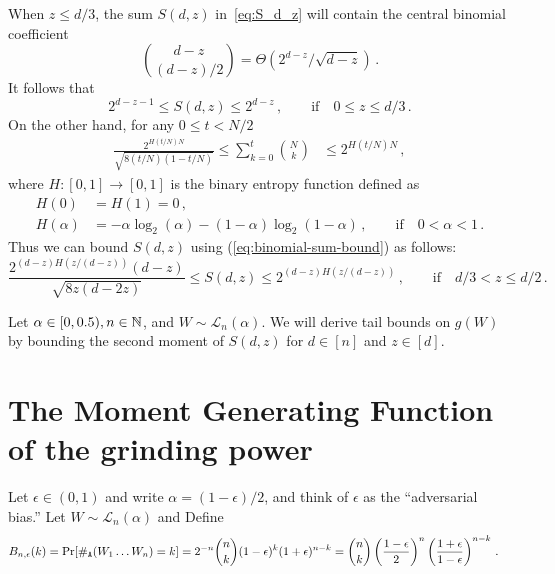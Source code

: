 When $z \leq d/3$, the sum $S(d,z)$ in~\eqref{eq:S_d_z} 
will contain the central binomial coefficient $${d-z \choose (d-z)/2} = \Theta(2^{d-z}/\sqrt{d-z})\,.$$ 
It follows that 
\begin{equation} \label{eq:S_d_z_small}
    2^{d-z-1} 
    \leq 
    S(d,z)
    \leq 2^{d-z}\,, 
    \qquad \text{if}\quad 0 \leq z \leq d/3 
    \,.
\end{equation}
On the other hand, for any $0 \leq t < N/2$
\begin{align}\label{eq:binomial-sum-bound}
\frac{2^{H(t/N)N} }{\sqrt{8 (t/N) (1-t/N)} }
\leq 
\sum_{k=0}^t{ {N \choose k} } 
&\leq 
2^{H(t/N)N} \, , 
\end{align}
where $H : [0, 1] \rightarrow [0, 1]$ is the binary entropy function defined as
\begin{align*}
    H(0) &= H(1) = 0\, , \\
    H(\alpha) &= -\alpha \log_2(\alpha) - (1-\alpha) \log_2(1-\alpha)\,, 
        \qquad \text{if}\quad 0 < \alpha < 1\, .
\end{align*}
Thus we can bound $S(d,z)$ using (\ref{eq:binomial-sum-bound}) as follows:
\begin{equation} \label{eq:S_d_z_large}
    \frac{2^{(d-z)H(z/(d-z))}(d-z)}{\sqrt{8 z(d-2z) }}
    \leq
    S(d, z) 
    \leq
    2^{(d-z)H(z/(d-z))}
    \,,\qquad \text{if} \quad d/3 < z \leq d/2 
    \,.
\end{equation}

Let $\alpha \in [0, 0.5), n \in \mathbb{N}$, and $W \sim \mathcal{L}_n(\alpha)$.
We will derive tail bounds on $g(W)$ by bounding the second moment of $S(d,z)$ 
for $d \in [n]$ and $z \in [d]$.




\section{The Moment Generating Function of the grinding power}
Let $\epsilon \in (0, 1)$ and write $\alpha = (1 - \epsilon)/2$, and 
think of $\epsilon$ as the ``adversarial bias.'' 
Let $W \sim \mathcal{L}_n(\alpha)$ and 
Define 
\begin{align}\label{eq:suffix-prob-binomial}
    B_{n, \epsilon}(k) 
    &= \Pr[ \#_{\mathtt{A}}(W_1 \ldots W_n) = k ]  
    = 2^{-n}\binom{n}{k} (1-\epsilon)^k (1 + \epsilon)^{n-k} 
    =  \binom{n}{k} 
        \left(\frac{1-\epsilon}{2}\right)^n 
        \left(\frac{1 + \epsilon}{1-\epsilon} \right)^{n-k} 
        \,.
\end{align}


